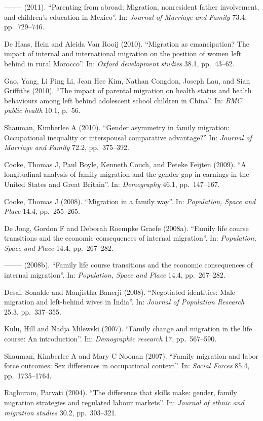 \documentclass[
  12pt,
]{article}
\begin{document}
-------- (2011). ``Parenting from abroad: Migration, nonresident father
involvement, and children's education in Mexico''. In:
\emph{Journal of Marriage and Family} 73.4, pp.~729--746.

De Haas, Hein and Aleida Van Rooij (2010). ``Migration as emancipation?
The impact of internal and international migration on the position of
women left behind in rural Morocco''. In:
\emph{Oxford development studies} 38.1, pp.~43--62.

Gao, Yang, Li Ping Li, Jean Hee Kim, Nathan Congdon, Joseph Lau, and
Sian Griffiths (2010). ``The impact of parental migration on health
status and health behaviours among left behind adolescent school
children in China''. In: \emph{BMC public health} 10.1, p.~56.

Shauman, Kimberlee A (2010). ``Gender asymmetry in family migration:
Occupational inequality or interspousal comparative advantage?'' In:
\emph{Journal of Marriage and Family} 72.2, pp.~375--392.

Cooke, Thomas J, Paul Boyle, Kenneth Couch, and Peteke Feijten (2009).
``A longitudinal analysis of family migration and the gender gap in
earnings in the United States and Great Britain''. In: \emph{Demography}
46.1, pp.~147--167.

Cooke, Thomas J (2008). ``Migration in a family way''. In:
\emph{Population, Space and Place} 14.4, pp.~255--265.

De Jong, Gordon F and Deborah Roempke Graefe (2008a). ``Family life
course transitions and the economic consequences of internal
migration''. In: \emph{Population, Space and Place} 14.4, pp.~267--282.

-------- (2008b). ``Family life course transitions and the economic
consequences of internal migration''. In:
\emph{Population, Space and Place} 14.4, pp.~267--282.

Desai, Sonalde and Manjistha Banerji (2008). ``Negotiated identities:
Male migration and left-behind wives in India''. In:
\emph{Journal of Population Research} 25.3, pp.~337--355.

Kulu, Hill and Nadja Milewski (2007). ``Family change and migration in
the life course: An introduction''. In: \emph{Demographic research} 17,
pp.~567--590.

Shauman, Kimberlee A and Mary C Noonan (2007). ``Family migration and
labor force outcomes: Sex differences in occupational context''. In:
\emph{Social Forces} 85.4, pp.~1735--1764.

Raghuram, Parvati (2004). ``The difference that skills make: gender,
family migration strategies and regulated labour markets''. In:
\emph{Journal of ethnic and migration studies} 30.2, pp.~303--321.
\end{document}
